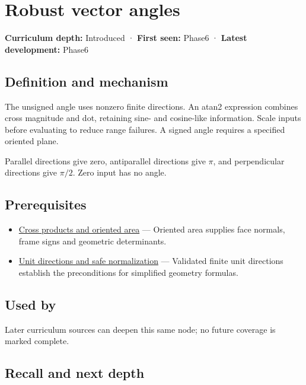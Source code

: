 \hypertarget{appendix-e569e60e18e6}{}\label{referencestart:appendix-e569e60e18e6}
\section{Robust vector angles}\label{appendix-e569e60e18e6-robust-vector-angles}

\textbf{Curriculum depth:} Introduced · \textbf{First seen:} Phase6 · \textbf{Latest development:} Phase6

\subsection{Definition and mechanism}\label{appendix-e569e60e18e6-definition-and-mechanism}

The unsigned angle uses nonzero finite directions. An atan2 expression combines cross magnitude and dot, retaining sine- and cosine-like information. Scale inputs before evaluating to reduce range failures. A signed angle requires a specified oriented plane.

Parallel directions give zero, antiparallel directions give \(\pi\), and perpendicular directions give \(\pi/2\). Zero input has no angle.

\subsection{Prerequisites}\label{appendix-e569e60e18e6-prerequisites}

\begin{itemize}
\tightlist
\item
  \hyperref[appendix-2391db8052b1]{Cross products and oriented area} --- Oriented area supplies face normals, frame signs and geometric determinants.
\item
  \hyperref[appendix-f744e41b95b4]{Unit directions and safe normalization} --- Validated finite unit directions establish the preconditions for simplified geometry formulas.
\end{itemize}

\subsection{Used by}\label{appendix-e569e60e18e6-used-by}

Later curriculum sources can deepen this same node; no future coverage is marked complete.

\subsection{Recall and next depth}\label{appendix-e569e60e18e6-recall-and-next-depth}

